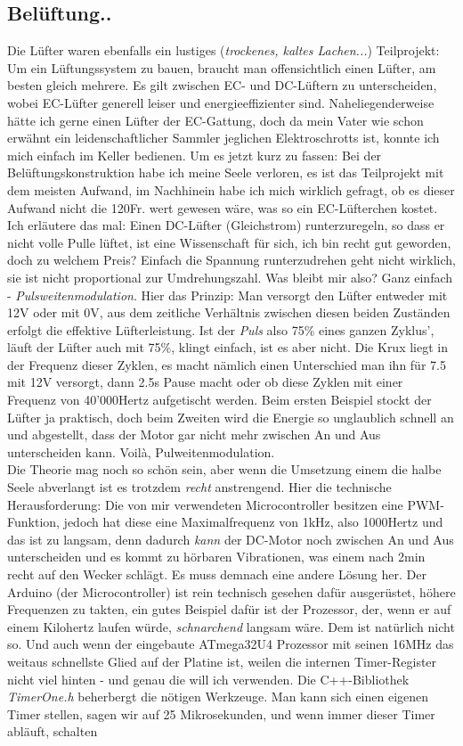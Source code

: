 \documentclass[12pt,titlepage,a4paper]{article}
\begin{document}
\subsection{Belüftung..}
Die Lüfter waren ebenfalls ein lustiges (\textit{trockenes, kaltes Lachen...}) Teilprojekt: Um ein Lüftungssystem zu bauen, braucht man offensichtlich einen Lüfter, am besten gleich mehrere. Es gilt zwischen EC- und DC-Lüftern zu unterscheiden, wobei EC-Lüfter generell leiser und energieeffizienter sind. Naheliegenderweise hätte ich gerne einen Lüfter der EC-Gattung, doch da mein Vater wie schon erwähnt ein leidenschaftlicher Sammler jeglichen Elektroschrotts ist, konnte ich mich einfach im Keller bedienen. Um es jetzt kurz zu fassen: Bei der Belüftungskonstruktion habe ich meine Seele verloren, es ist das Teilprojekt mit dem meisten Aufwand, im Nachhinein habe ich mich wirklich gefragt, ob es dieser Aufwand nicht die 120Fr. wert gewesen wäre, was so ein EC-Lüfterchen kostet. Ich erläutere das mal: Einen DC-Lüfter (Gleichstrom) runterzuregeln, so dass er nicht volle Pulle lüftet, ist eine Wissenschaft für sich, ich bin recht gut geworden, doch zu welchem Preis? Einfach die Spannung runterzudrehen geht nicht wirklich, sie ist nicht proportional zur Umdrehungszahl. Was bleibt mir also? Ganz einfach - \textit{Pulsweitenmodulation}. Hier das Prinzip: Man versorgt den Lüfter entweder mit 12V oder mit 0V, aus dem zeitliche Verhältnis zwischen diesen beiden Zuständen erfolgt die effektive Lüfterleistung. Ist der \textit{Puls} also 75\% eines ganzen Zyklus', läuft der Lüfter auch mit 75\%, klingt einfach, ist es aber nicht. Die Krux liegt in der Frequenz dieser Zyklen, es macht nämlich einen Unterschied man ihn für 7.5 mit 12V versorgt, dann 2.5s Pause macht oder ob diese Zyklen mit einer Frequenz von 40'000Hertz aufgetischt werden. Beim ersten Beispiel stockt der Lüfter ja praktisch, doch beim Zweiten wird die Energie so unglaublich schnell an und abgestellt, dass der Motor gar nicht mehr zwischen An und Aus unterscheiden kann. Voilà, Pulweitenmodulation. \\ Die Theorie mag noch so schön sein, aber wenn die Umsetzung einem die halbe Seele abverlangt ist es trotzdem \textit{recht} anstrengend. Hier die technische Herausforderung: Die von mir verwendeten Microcontroller besitzen eine PWM-Funktion, jedoch hat diese eine Maximalfrequenz von 1kHz, also 1000Hertz und das ist zu langsam, denn dadurch \textit{kann} der DC-Motor noch zwischen An und Aus unterscheiden und es kommt zu hörbaren Vibrationen, was einem nach 2min recht auf den Wecker schlägt. Es muss demnach eine andere Lösung her. Der Arduino (der Microcontroller) ist rein technisch gesehen dafür ausgerüstet, höhere Frequenzen zu takten, ein gutes Beispiel dafür ist der Prozessor, der, wenn er auf einem Kilohertz laufen würde, \textit{schnarchend} langsam wäre. Dem ist natürlich nicht so. Und auch wenn der eingebaute ATmega32U4 Prozessor mit seinen 16MHz das weitaus schnellste Glied auf der Platine ist, weilen die internen Timer-Register nicht viel hinten - und genau die will ich verwenden. Die C++-Bibliothek \textit{TimerOne.h} beherbergt die nötigen Werkzeuge. Man kann sich einen eigenen Timer stellen, sagen wir auf 25 Mikrosekunden, und wenn immer dieser Timer abläuft, schalten 
\end{document}
